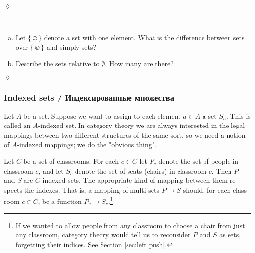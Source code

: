 \documentclass{book}
\def\singleton{\{\smiley\}}
\def\to{\rightarrow}
\theoremstyle{theoremENG}
\theoremstyle{lemmaENG}
\theoremstyle{propositionENG}
\theoremstyle{corollaryENG}
\theoremstyle{factENG}
\theoremstyle{remarkENG}
\theoremstyle{exampleENG}
\newtheorem{exampleENG}[subsubsection]{\begin{english}Example\end{english}}
\theoremstyle{warningENG}
\theoremstyle{questionENG}
\theoremstyle{guessENG}
\theoremstyle{answerENG}
\theoremstyle{constructionENG}
\theoremstyle{rulesENG}
\theoremstyle{excENG}
\newtheorem{excENG}[subsubsection]{\begin{english}Exercise\end{english}}
\theoremstyle{appENG}
\theoremstyle{definitionENG}
\theoremstyle{notationENG}
\theoremstyle{conjectureENG}
\theoremstyle{postulateENG}
\newenvironment{exerciseENG}{\begin{excENG}}{\hspace*{\fill}$\lozenge$\end{excENG}}
\theoremstyle{theoremRUS}
\theoremstyle{lemmaRUS}
\theoremstyle{propositionRUS}
\theoremstyle{corollaryRUS}
\theoremstyle{factRUS}
\theoremstyle{remarkRUS}
\theoremstyle{exampleRUS}
\theoremstyle{warningRUS}
\theoremstyle{questionRUS}
\theoremstyle{guessRUS}
\theoremstyle{answerRUS}
\theoremstyle{constructionRUS}
\theoremstyle{rulesRUS}
\theoremstyle{excRUS}
\theoremstyle{appRUS}
\theoremstyle{definitionRUS}
\theoremstyle{notationRUS}
\theoremstyle{conjectureRUS}
\theoremstyle{postulateRUS}
\def\sexc{\begin{enumerate}[a.)]\setlength{\itemsep}{.1cm}\setlength{\parskip}{.1cm}\item}
\def\next{\item}
\def\endsexc{\end{enumerate}}
\begin{document}
\begin{english}
\begin{exerciseENG}
\begin{russian} \end{russian}

\end{exerciseENG}

\begin{exerciseENG}~

\sexc Let $\singleton$ denote a set with one element. What is the difference between sets over $\singleton$ and simply sets?
\next Describe the sets relative to $\emptyset$. How many are there?
\endsexc

\begin{russian} \end{russian}

\end{exerciseENG}


\subsubsection{Indexed sets / Индексированные множества}\label{sec:indexed sets}

Let $A$ be a set. Suppose we want to assign to each element $a\in A$ a set $S_a$. This is called an $A$-indexed set. In category theory we are always interested in the legal mappings between two different structures of the same sort, so we need a notion of $A$-indexed mappings; we do the "obvious thing".

\begin{russian} \end{russian}

\begin{exampleENG}\label{ex:classroom seats}

Let $C$ be a set of classrooms. For each $c\in C$ let $P_c$ denote the set of people in classroom $c$, and let $S_c$ denote the set of seats (chairs) in classroom $c$. Then $P$ and $S$ are $C$-indexed sets. The appropriate kind of mapping between them respects the indexes. That is, a mapping of multi-sets $P\to S$ should, for each classroom $c\in C$, be a function $P_c\to S_c$.\footnote{If we wanted to allow people from any classroom to choose a chair from just any classroom, category theory would tell us to reconsider $P$ and $S$ as sets, forgetting their indices. See Section \ref{sec:left push}.}

\begin{russian} \end{russian}


\end{exampleENG}
\end{english}
\end{document}

